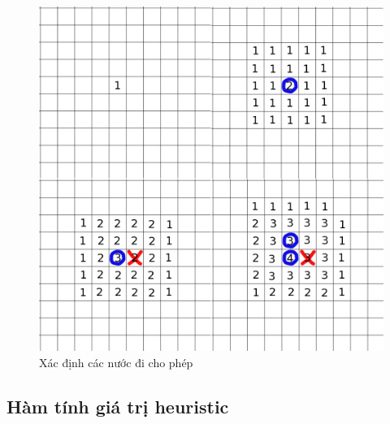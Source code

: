 \documentclass[12pt]{report}
\begin{document}
\begin{figure}[H]
\centering
\caption{Xác định các nước đi cho phép}
\includegraphics[width=\textwidth]{legal-action-impl.png}
\end{figure}


\subsection{Hàm tính giá trị heuristic}
\end{document}
